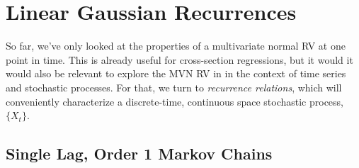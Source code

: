 \documentclass[a4paper,12pt]{scrartcl}
\begin{document}
\newpage 
\section{Linear Gaussian Recurrences}

So far, we've only looked at the properties of a multivariate
normal RV at one point in time. This is already useful for 
cross-section regressions, but it would 
it would also be relevant to explore
the MVN RV in in the context of time series and stochastic 
processes. For that, we turn
to \emph{recurrence relations}, which will conveniently characterize
a discrete-time, continuous space stochastic process, 
$\{{X}_t\}$.

\subsection{Single Lag, Order 1 Markov Chains}
\end{document}
